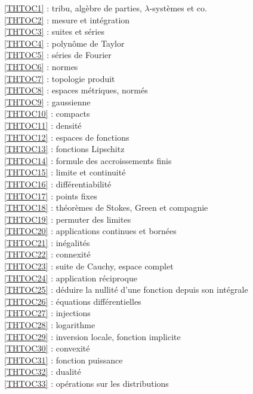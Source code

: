 \ref {THTOC1} : tribu, algèbre de parties, \( \lambda \)-systèmes et co.\\
\ref {THTOC2} : mesure et intégration\\
\ref {THTOC3} : suites et séries\\
\ref {THTOC4} : polynôme de Taylor\\
\ref {THTOC5} : séries de Fourier\\
\ref {THTOC6} : normes\\
\ref {THTOC7} : topologie produit\\
\ref {THTOC8} : espaces métriques, normés\\
\ref {THTOC9} : gaussienne\\
\ref {THTOC10} : compacts\\
\ref {THTOC11} : densité\\
\ref {THTOC12} : espaces de fonctions\\
\ref {THTOC13} : fonctions Lipschitz\\
\ref {THTOC14} : formule des accroissements finis\\
\ref {THTOC15} : limite et continuité\\
\ref {THTOC16} : différentiabilité\\
\ref {THTOC17} : points fixes\\
\ref {THTOC18} : théorèmes de Stokes, Green et compagnie\\
\ref {THTOC19} : permuter des limites\\
\ref {THTOC20} : applications continues et bornées\\
\ref {THTOC21} : inégalités\\
\ref {THTOC22} : connexité\\
\ref {THTOC23} : suite de Cauchy, espace complet\\
\ref {THTOC24} : application réciproque\\
\ref {THTOC25} : déduire la nullité d'une fonction depuis son intégrale\\
\ref {THTOC26} : équations différentielles\\
\ref {THTOC27} : injections\\
\ref {THTOC28} : logarithme\\
\ref {THTOC29} : inversion locale, fonction implicite\\
\ref {THTOC30} : convexité\\
\ref {THTOC31} : fonction puissance\\
\ref {THTOC32} : dualité\\
\ref {THTOC33} : opérations sur les distributions\\
